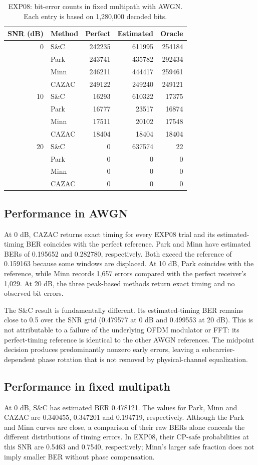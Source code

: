 \begin{table}[!htbp]
\centering\small
\caption[EXP08: bit-error counts in fixed multipath.]{EXP08: bit-error counts in fixed multipath with AWGN. Each entry is based on 1,280,000 decoded bits.}
\label{tab:ch5mp}
\begin{tabular}{rlrrr}\hline
SNR (dB)&Method&Perfect&Estimated&Oracle\\\hline
0&S\&C&242235&611995&254184\\
 &Park&243741&435782&292434\\
 &Minn&246211&444417&259461\\
 &CAZAC&249122&249240&249121\\\hline
10&S\&C&16293&610322&17375\\
 &Park&16777&23517&16874\\
 &Minn&17511&20102&17548\\
 &CAZAC&18404&18404&18404\\\hline
20&S\&C&0&637574&22\\
 &Park&0&0&0\\
 &Minn&0&0&0\\
 &CAZAC&0&0&0\\\hline
\end{tabular}
\end{table}

\subsection{Performance in AWGN}
At 0 dB, CAZAC returns exact timing for every EXP08 trial and its estimated-timing BER coincides with the perfect reference. Park and Minn have estimated BERs of 0.195652 and 0.282780, respectively. Both exceed the reference of 0.159163 because some windows are displaced. At 10 dB, Park coincides with the reference, while Minn records 1,657 errors compared with the perfect receiver's 1,029. At 20 dB, the three peak-based methods return exact timing and no observed bit errors.

The S\&C result is fundamentally different. Its estimated-timing BER remains close to 0.5 over the SNR grid (0.479577 at 0 dB and 0.499553 at 20 dB). This is not attributable to a failure of the underlying OFDM modulator or FFT: its perfect-timing reference is identical to the other AWGN references. The midpoint decision produces predominantly nonzero early errors, leaving a subcarrier-dependent phase rotation that is not removed by physical-channel equalization.

\subsection{Performance in fixed multipath}
At 0 dB, S\&C has estimated BER 0.478121. The values for Park, Minn and CAZAC are 0.340455, 0.347201 and 0.194719, respectively. Although the Park and Minn curves are close, a comparison of their raw BERs alone conceals the different distributions of timing errors. In EXP08, their CP-safe probabilities at this SNR are 0.5463 and 0.7540, respectively; Minn's larger safe fraction does not imply smaller BER without phase compensation.

